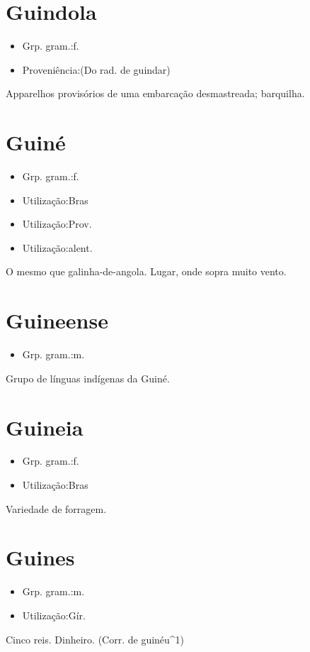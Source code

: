 \section{Guindola}
\begin{itemize}
\item {Grp. gram.:f.}
\end{itemize}
\begin{itemize}
\item {Proveniência:(Do rad. de \textunderscore guindar\textunderscore )}
\end{itemize}
Apparelhos provisórios de uma embarcação desmastreada; barquilha.
\section{Guiné}
\begin{itemize}
\item {Grp. gram.:f.}
\end{itemize}
\begin{itemize}
\item {Utilização:Bras}
\end{itemize}
\begin{itemize}
\item {Utilização:Prov.}
\end{itemize}
\begin{itemize}
\item {Utilização:alent.}
\end{itemize}
O mesmo que \textunderscore galinha-de-angola\textunderscore .
Lugar, onde sopra muito vento.
\section{Guineense}
\begin{itemize}
\item {Grp. gram.:m.}
\end{itemize}
Grupo de línguas indígenas da Guiné.
\section{Guineia}
\begin{itemize}
\item {Grp. gram.:f.}
\end{itemize}
\begin{itemize}
\item {Utilização:Bras}
\end{itemize}
Variedade de forragem.
\section{Guines}
\begin{itemize}
\item {Grp. gram.:m.}
\end{itemize}
\begin{itemize}
\item {Utilização:Gír.}
\end{itemize}
Cinco reis.
Dinheiro.
(Corr. de \textunderscore guinéu\textunderscore ^1)
